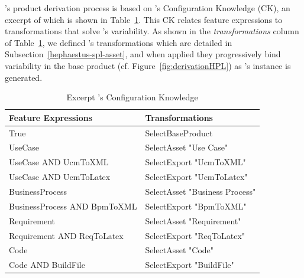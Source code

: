 
\hpl's product derivation process is based on \hpl's Configuration Knowledge (CK), an excerpt of which is shown in Table~\ref{tab:ck-hpl}.  This CK relates feature expressions to transformations that solve \hpl{}'s variability.  As shown in the \textit{transformations} column of Table~\ref{tab:ck-hpl}, we defined \hpl's transformations which are detailed in Subsection~\ref{hephaestus-spl-asset}, and when applied they progressively bind variability in the base product (cf. Figure~\ref{fig:derivationHPL}) as \hpl's instance is generated.




\begin{table}[h]
\begin{center}
\begin{tabular}{||l||l||}
  \hline
  \textbf{Feature Expressions} & \textbf{Transformations}   \\  \hline
  True & SelectBaseProduct \\  \hline
  UseCase & SelectAsset "Use Case" \\ \hline
  UseCase AND UcmToXML & SelectExport "UcmToXML"  \\ \hline
  UseCase AND UcmToLatex & SelectExport "UcmToLatex" \\ \hline
  BusinessProcess & SelectAsset "Business Process" \\ \hline
  BusinessProcess AND BpmToXML & SelectExport "BpmToXML" \\ \hline
  Requirement & SelectAsset "Requirement" \\ \hline
  Requirement AND ReqToLatex & SelectExport "ReqToLatex" \\ \hline
  Code & SelectAsset "Code" \\ \hline
  Code AND BuildFile & SelectExport "BuildFile" \\ \hline
\end{tabular}
\caption{Excerpt \hpl's Configuration Knowledge}
\label{tab:ck-hpl}
\end{center}
\end{table}

